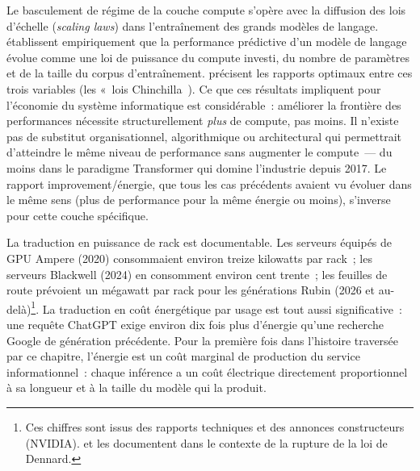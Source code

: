 %
Le basculement de régime de la couche compute s'opère avec la diffusion des lois d'échelle (\emph{scaling laws}) dans l'entraînement des grands modèles de langage. \textcite{kaplan_scaling_2020} établissent empiriquement que la performance prédictive d'un modèle de langage évolue comme une loi de puissance du compute investi, du nombre de paramètres et de la taille du corpus d'entraînement. \textcite{hoffmann_training_2022} précisent les rapports optimaux entre ces trois variables (les «~lois Chinchilla~\fg). Ce que ces résultats impliquent pour l'économie du système informatique est considérable~: améliorer la frontière des performances nécessite structurellement \emph{plus} de compute, pas moins. Il n'existe pas de substitut organisationnel, algorithmique ou architectural qui permettrait d'atteindre le même niveau de performance sans augmenter le compute~--- du moins dans le paradigme Transformer qui domine l'industrie depuis 2017. Le rapport improvement/énergie, que tous les cas précédents avaient vu évoluer dans le même sens (plus de performance pour la même énergie ou moins), s'inverse pour cette couche spécifique.

%
La traduction en puissance de rack est documentable. Les serveurs équipés de GPU Ampere (2020) consommaient environ treize kilowatts par rack~; les serveurs Blackwell (2024) en consomment environ cent trente~; les feuilles de route prévoient un mégawatt par rack pour les générations Rubin (2026 et au-delà)\footnote{Ces chiffres sont issus des rapports techniques et des annonces constructeurs (NVIDIA). \textcite{sun_chip_2024} et \textcite{roussilhe_phase_2025} les documentent dans le contexte de la rupture de la loi de Dennard.}. La traduction en coût énergétique par usage est tout aussi significative~: une requête ChatGPT exige environ dix fois plus d'énergie qu'une recherche Google de génération précédente. Pour la première fois dans l'histoire traversée par ce chapitre, l'énergie est un coût marginal de production du service informationnel~: chaque inférence a un coût électrique directement proportionnel à sa longueur et à la taille du modèle qui la produit.

